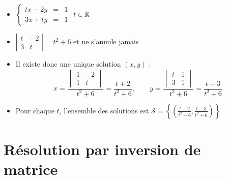 \begin{frame}
\begin{exemple}
\begin{itemize}\setlength{\itemsep}{8pt}
  \item $
\left\{\begin{array}{rcl} 
t x - 2y   & = & 1\\
3x + t y & = & 1 
\end{array}\right.  
$ \qquad $t\in \mathbb{R}$

\pause
  
  \item $\left| \begin{smallmatrix} t & -2 \\ 3 & t \end{smallmatrix}\right|= t^2+6$
et ne s'annule jamais

\pause
  
  \item Il existe donc une unique solution $(x,y)$ :
$$x = \frac{\begin{vmatrix} 1 & -2 \\ 1 & t \end{vmatrix}}{t^2+6} = \frac{t+2}{t^2+6}, \qquad
y = \frac{\begin{vmatrix} t & 1 \\ 3 & 1 \end{vmatrix}}{t^2+6} = \frac{t-3}{t^2+6}$$
\pause
  
  \item Pour chaque $t$, l'ensemble des solutions est 
$\mathcal{S}= \left\lbrace \left(\frac{t+2}{t^2+6},\frac{t-3}{t^2+6}\right) \right\rbrace$
\end{itemize}

\end{exemple}

\end{frame}

\section{Résolution par inversion de matrice}

